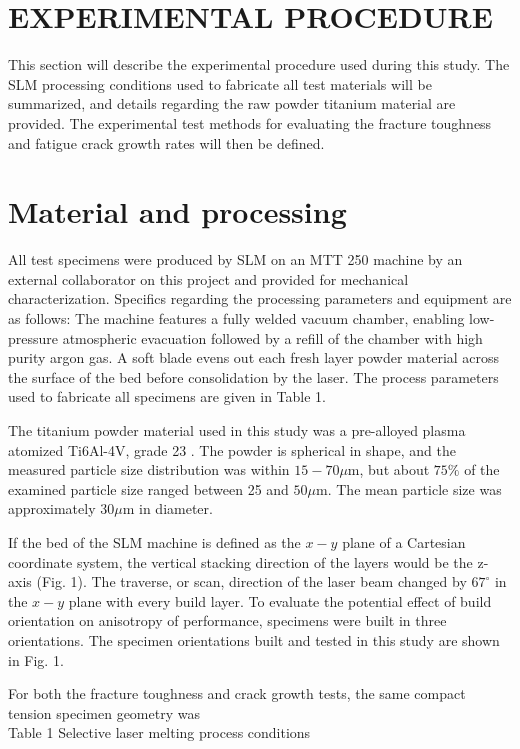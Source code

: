 \documentclass[10pt]{article}
\begin{document}
\section*{EXPERIMENTAL PROCEDURE}
This section will describe the experimental procedure used during this study. The SLM processing conditions used to fabricate all test materials will be summarized, and details regarding the raw powder titanium material are provided. The experimental test methods for evaluating the fracture toughness and fatigue crack growth rates will then be defined.

\section*{Material and processing}
All test specimens were produced by SLM on an MTT 250 machine by an external collaborator on this project and provided for mechanical characterization. Specifics regarding the processing parameters and equipment are as follows: The machine features a fully welded vacuum chamber, enabling low-pressure atmospheric evacuation followed by a refill of the chamber with high purity argon gas. A soft blade evens out each fresh layer powder material across the surface of the bed before consolidation by the laser. The process parameters used to fabricate all specimens are given in Table 1.

The titanium powder material used in this study was a pre-alloyed plasma atomized Ti6Al-4V, grade 23 . The powder is spherical in shape, and the measured particle size distribution was within $15-70 \mu \mathrm{m}$, but about $75 \%$ of the examined particle size ranged between 25 and $50 \mu \mathrm{m}$. The mean particle size was approximately $30 \mu \mathrm{m}$ in diameter.

If the bed of the SLM machine is defined as the $x-y$ plane of a Cartesian coordinate system, the vertical stacking direction of the layers would be the z-axis (Fig. 1). The traverse, or scan, direction of the laser beam changed by $67^{\circ}$ in the $x-y$ plane with every build layer. To evaluate the potential effect of build orientation on anisotropy of performance, specimens were built in three orientations. The specimen orientations built and tested in this study are shown in Fig. 1.

For both the fracture toughness and crack growth tests, the same compact tension specimen geometry was\\
Table 1 Selective laser melting process conditions
\end{document}
